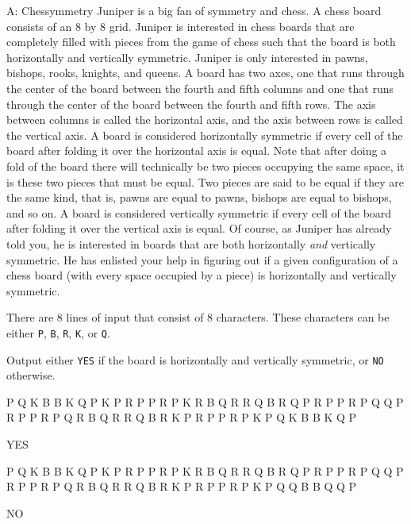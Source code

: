 \begin{problem}{A: Chessymmetry} 
Juniper is a big fan of symmetry and chess.
A chess board consists of an 8 by 8 grid.
Juniper is interested in chess boards that are completely filled with pieces from the game of chess such that the board is both horizontally and vertically symmetric.
Juniper is only interested in pawns, bishops, rooks, knights, and queens.
A board has two axes, one that runs through the center of the board between the fourth and fifth columns and one that runs through the center of the board between the fourth and fifth rows.
The axis between columns is called the horizontal axis, and the axis between rows is called the vertical axis.
A board is considered horizontally symmetric if every cell of the board after folding it over the horizontal axis is equal.
Note that after doing a fold of the board there will technically be two pieces occupying the same space, it is these two pieces that must be equal.
Two pieces are said to be equal if they are the same kind, that is, pawns are equal to pawns, bishops are equal to bishops, and so on.
A board is considered vertically symmetric if every cell of the board after folding it over the vertical axis is equal.
Of course, as Juniper has already told you, he is interested in boards that are both horizontally \textit{and} vertically symmetric.
He has enlisted your help in figuring out if a given configuration of a chess board (with every space occupied by a piece) is horizontally and vertically symmetric.
\end{problem}

\begin{formalin}
There are 8 lines of input that consist of 8 characters.
These characters can be either \texttt{P}, \texttt{B}, \texttt{R}, \texttt{K}, or \texttt{Q}.
\end{formalin}

\begin{formalout}
Output either \texttt{YES} if the board is horizontally and vertically symmetric, or \texttt{NO} otherwise. 
\end{formalout}

\begin{datain}
P Q K B B K Q P
K P R P P R P K
R B Q R R Q B R
Q P R P P R P Q
Q P R P P R P Q
R B Q R R Q B R
K P R P P R P K
P Q K B B K Q P
\end{datain}
\begin{dataout}
YES
\end{dataout}

\begin{datain}
P Q K B B K Q P
K P R P P R P K
R B Q R R Q B R
Q P R P P R P Q
Q P R P P R P Q
R B Q R R Q B R
K P R P P R P K
P Q Q B B Q Q P
\end{datain}
\begin{dataout}
NO
\end{dataout}
